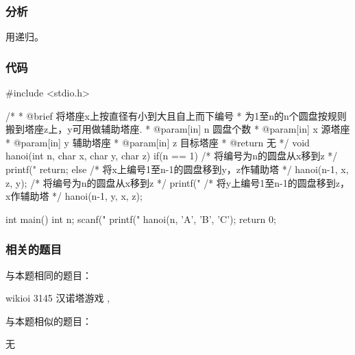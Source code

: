 \subsubsection{分析}
用递归。


\subsubsection{代码}

\begin{Codex}[label=hanoi.c]
#include <stdio.h>

/*
 * @brief 将塔座x上按直径有小到大且自上而下编号
 * 为1至n的n个圆盘按规则搬到塔座z上，y可用做辅助塔座.
 * @param[in] n 圆盘个数
 * @param[in] x 源塔座
 * @param[in] y 辅助塔座
 * @param[in] z 目标塔座
 * @return 无
 */
void hanoi(int n, char x, char y, char z) {
    if(n ==  1) {
        /* 将编号为n的圆盘从x移到z */
        printf("%
        return;
    } else {
        /* 将x上编号1至n-1的圆盘移到y，z作辅助塔 */
        hanoi(n-1, x, z, y);
        /* 将编号为n的圆盘从x移到z */
        printf("%
        /* 将y上编号1至n-1的圆盘移到z，x作辅助塔 */
        hanoi(n-1, y, x, z);
    }
}

int main() {
    int n;
    scanf("%
    printf("%
    hanoi(n, 'A', 'B', 'C');
    return 0;
}
\end{Codex}


\subsubsection{相关的题目}
与本题相同的题目：
\begindot
\item wikioi 3145 汉诺塔游戏 , 
\myenddot

与本题相似的题目：
\begindot
\item  无
\myenddot


